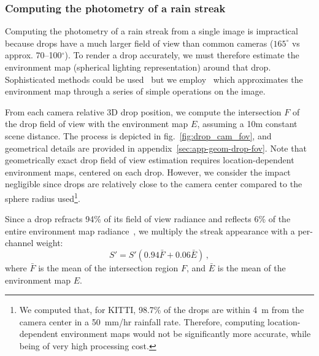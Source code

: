 \subsubsection{Computing the photometry of a rain streak}
\label{sec:photometry-rainstreak}

Computing the photometry of a rain streak from a single image is impractical because drops have a much larger field of view than common cameras ($165^\circ$ vs approx. 70--100$^\circ$). To render a drop accurately, we must therefore estimate the environment map (spherical lighting representation) around that drop. 
Sophisticated methods could be used~\cite{holdgeoffroy-cvpr-17,holdgeoffroy-cvpr-19,zhang-cvpr-19} but we employ~\cite{Cameron2005} which approximates the environment map through a series of simple operations on the image. 

From each camera relative 3D drop position, we compute the intersection $F$ of the drop field of view with the environment map $E$, assuming a 10m constant scene distance.
The process is depicted in fig.~\ref{fig:drop_cam_fov}, and geometrical details are provided in appendix~\ref{sec:app-geom-drop-fov}.
Note that geometrically exact drop field of view estimation requires location-dependent environment maps, centered on each drop. However, we consider the impact negligible since drops are relatively close to the camera center compared to the sphere radius used\footnote{We computed that, for KITTI, 98.7\% of the drops are within 4~m from the camera center in a 50~mm/hr rainfall rate. Therefore, computing location-dependent environment maps would not be significantly more accurate,  while being of very high processing cost.}. 

Since a drop refracts 94\% of its field of view radiance and reflects 6\% of the entire environment map radiance~\cite{garg2007vision}, we multiply the streak appearance with a per-channel weight: 
\begin{equation}
S' = S' (0.94 \bar{F} + 0.06 \bar{E}) \,,
\label{eq:photometry_rainstreak}
\end{equation}
where $\bar{F}$ is the mean of the intersection region $F$, and $\bar{E}$ is the mean of the environment map $E$. 


